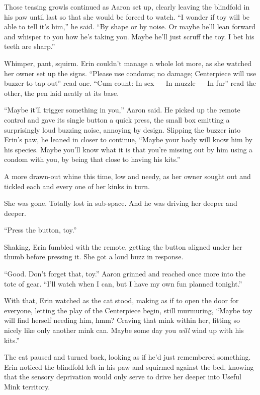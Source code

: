 \documentclass[12pt,letterpaper,oneside]{memoir}
\begin{document}
  Those teasing growls continued as Aaron set up, clearly leaving the blindfold in his paw until last so that she would be forced to watch. ``I wonder if toy will be able to tell it's him,'' he said. ``By shape or by noise. Or maybe he'll lean forward and whisper to you how he's taking you. Maybe he'll just scruff the toy. I bet his teeth are sharp.''

  Whimper, pant, squirm. Erin couldn't manage a whole lot more, as she watched her owner set up the signs. ``Please use condoms; no damage; Centerpiece will use buzzer to tap out'' read one. ``Cum count: In sex --- In muzzle --- In fur'' read the other, the pen laid neatly at its base.

  ``Maybe it'll trigger something in you,'' Aaron said. He picked up the remote control and gave its single button a quick press, the small box emitting a surprisingly loud buzzing noise, annoying by design. Slipping the buzzer into Erin's paw, he leaned in closer to continue, ``Maybe your body will know him by his species. Maybe you'll know what it is that you're missing out by him using a condom with you, by being that close to having his kits.''

  A more drawn-out whine this time, low and needy, as her owner sought out and tickled each and every one of her kinks in turn.

  She was gone. Totally lost in sub-space. And he was driving her deeper and deeper.

  ``Press the button, toy.''

  Shaking, Erin fumbled with the remote, getting the button aligned under her thumb before pressing it. She got a loud buzz in response.

  ``Good. Don't forget that, toy.'' Aaron grinned and reached once more into the tote of gear. ``I'll watch when I can, but I have my own fun planned tonight.''

  With that, Erin watched as the cat stood, making as if to open the door for everyone, letting the play of the Centerpiece begin, still murmuring, ``Maybe toy will find herself needing him, hmm? Craving that mink within her, fitting so nicely like only another mink can. Maybe some day you \textit{will} wind up with his kits.''

  The cat paused and turned back, looking as if he'd just remembered something. Erin noticed the blindfold left in his paw and squirmed against the bed, knowing that the sensory deprivation would only serve to drive her deeper into Useful Mink territory.
\end{document}
